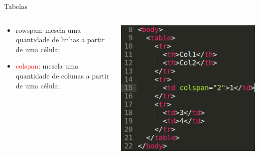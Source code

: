 \documentclass{beamer}
\begin{document}
\begin{frame}{Tabelas}
    \begin{columns}
    \begin{column}{0.5 \textwidth}
      \small
     \begin{itemize}
       \item rowspan: mescla uma quantidade de linhas a partir 
	 de uma célula;
      \item \textcolor{red}{colspan}: mescla uma quantidade de colunas a partir 
	de uma célula;
     \end{itemize}
    \end{column}
    
    \begin{column}{0.5\textwidth}
     \includegraphics[height=0.5\paperheight]{fig/aula2/aula4_6.png}
    \end{column}
  \end{columns}
\end{frame}
\end{document}
